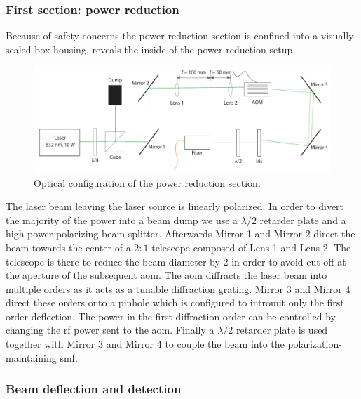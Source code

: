 \subsubsection{First section: power reduction}\label{subsec:setup_power_reduction}

Because of safety concerns the power reduction section is confined into a
visually sealed box housing.  reveals the
inside of the power reduction setup.
\begin{figure}[htb]
  \centering
  \includegraphics[width=\textwidth]{../figure/setup/power-reduction.pdf}
  \caption{Optical configuration of the power reduction section.
  }\label{fig:setup_power_reduction}
\end{figure}
The laser beam leaving the laser source is linearly polarized. In order to
divert the majority of the power into a beam dump we use a $\lambda/2$
retarder plate and a high-power polarizing beam splitter. Afterwards Mirror
\num{1} and Mirror \num{2} direct the beam towards the center of a $2:1$
telescope composed of Lens \num{1} and Lens \num{2}. The telescope is there to
reduce the beam diameter by \num{2} in order to avoid cut-off at the aperture
of the subsequent \gls{aom}. The \gls{aom} diffracts the laser beam into
multiple orders as it acts as a tunable diffraction grating. Mirror \num{3}
and Mirror \num{4} direct these orders onto a pinhole which is configured to
intromit only the first order deflection. The power in the first diffraction
order can be controlled by changing the \gls{rf} power sent to the \gls{aom}.
Finally a $\lambda/2$ retarder plate is used together with Mirror \num{3} and
Mirror \num{4} to couple the beam into the polarization-maintaining \gls{smf}.

\subsubsection{Beam deflection and detection}\label{subsec:setup_deflection_detection}

